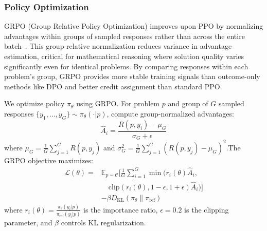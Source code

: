 \documentclass[a4paper,fleqn]{cas-dc}
\theoremstyle{definition}
\begin{document}
\subsubsection{Policy Optimization}
GRPO (Group Relative Policy Optimization) improves upon PPO by normalizing advantages within groups of sampled responses rather than across the entire batch~\cite{deepseek-r1}. This group-relative normalization reduces variance in advantage estimation, critical for mathematical reasoning where solution quality varies significantly even for identical problems. By comparing responses within each problem's group, GRPO provides more stable training signals than outcome-only methods like DPO and better credit assignment than standard PPO.

We optimize policy $\pi_\theta$ using GRPO. For problem $p$ and group of $G$ sampled responses $\{y_1, \ldots, y_G\} \sim \pi_\theta(\cdot|p)$, compute group-normalized advantages:
\begin{equation}
\hat{A}_i = \frac{R(p, y_i) - \mu_G}{\sigma_G + \epsilon}
\end{equation}
where $\mu_G = \frac{1}{G}\sum_{j=1}^G R(p, y_j)$ and $\sigma_G^2 = \frac{1}{G}\sum_{j=1}^G (R(p, y_j) - \mu_G)^2$.The GRPO objective maximizes:
\begin{equation}
\begin{aligned}
\mathcal{L}(\theta) ={} & \mathbb{E}_{p \sim \mathcal{C}} \Bigg[ \frac{1}{G} \sum_{i=1}^{G} \min\Big( r_i(\theta) \hat{A}_i, \\
& \quad \text{clip}(r_i(\theta), 1{-}\epsilon, 1{+}\epsilon) \hat{A}_i \Big) \Bigg] \\
& - \beta D_{\text{KL}}(\pi_\theta \| \pi_{\text{ref}})
\end{aligned}
\end{equation}
where $r_i(\theta) = \frac{\pi_\theta(y_i|p)}{\pi_{\text{ref}}(y_i|p)}$ is the importance ratio, $\epsilon = 0.2$ is the clipping parameter, and $\beta$ controls KL regularization.
\end{document}
